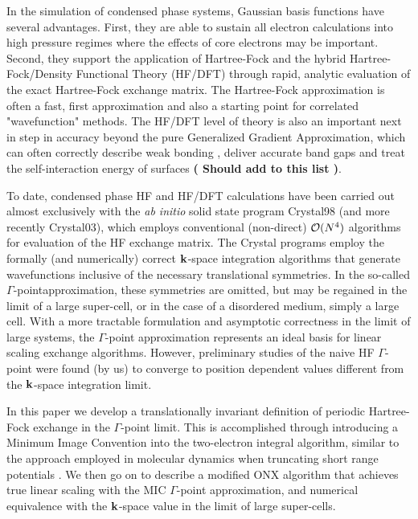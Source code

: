 \documentclass[prb,aps,nobibnotes,twocolumn,doublespace,twocolumngrid,superbib]{revtex4}
\begin{document}
In the simulation of condensed phase systems, Gaussian basis functions have several 
advantages.  First, they are able to sustain all electron calculations into high 
pressure regimes where the effects of core electrons may be important. Second, they
support the application of Hartree-Fock and the hybrid Hartree-Fock/Density Functional 
Theory (HF/DFT) \cite{Gill92,Becke93,VBarone96,CAdamo99} through rapid, 
analytic evaluation of the exact Hartree-Fock exchange matrix.  
The Hartree-Fock approximation is often a fast, first approximation and also a starting point 
for correlated "wavefunction" methods.  The HF/DFT level of theory is also an important next 
in step in accuracy beyond the pure Generalized Gradient Approximation, which can often correctly 
describe  weak bonding \cite{}, deliver accurate band gaps \cite{} and treat the self-interaction 
energy of surfaces \cite{} {\bf( Should add to this list )}.  

To date, condensed phase HF and HF/DFT calculations have been carried out almost 
exclusively with the {\em ab initio} solid state program {\sc Crystal98} \cite{} (and
more recently {\sc Crystal03}), which employs conventional (non-direct) ${\cal O}(N^4)$ 
algorithms for evaluation of the HF exchange matrix.  The {\sc Crystal} programs employ the
formally (and numerically) correct ${\bf k}$-space integration algorithms that generate 
wavefunctions  inclusive of the necessary translational symmetries.   In the so-called 
$\Gamma$-pointapproximation,  these symmetries are omitted, but may be regained in the limit 
of a large super-cell,  or in the case of a disordered medium, simply a large cell.  With a more
tractable  formulation and asymptotic correctness in the limit of large systems, the
$\Gamma$-point  approximation represents an ideal basis for linear scaling exchange 
algorithms.   However, preliminary studies of the naive HF $\Gamma$-point were found (by us)
to converge to position dependent values different from the ${\bf k}$-space integration 
limit.   

In this paper we develop a translationally invariant definition of periodic Hartree-Fock exchange 
in the $\Gamma$-point limit.  This is accomplished through introducing a Minimum Image Convention
into the two-electron integral algorithm, similar to the approach employed in molecular 
dynamics when truncating short range potentials \cite{}.  We then go on to describe a modified 
{\sc ONX} algorithm \cite{} that achieves true linear scaling with the MIC $\Gamma$-point 
approximation, and numerical equivalence with the ${\bf k}$-space value in the limit of 
large super-cells.
\end{document}
